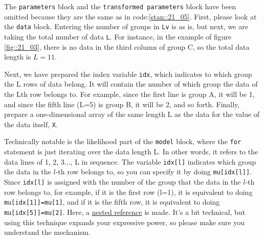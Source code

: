\documentclass{ltjsbook}
\begin{document}
The \verb|parameters| block and the \verb|transformed parameters| block have been omitted because they are the same as in code:\ref{stan::21_05}.
First, please look at the \verb|data| block. Entering the number of groups in \verb|Lv| is as is, but next, we are taking the total number of data \verb|L|. For instance, in the example of figure \ref{fig::21_03}, there is no data in the third column of group C, so the total data length is $L=11$.

Next, we have prepared the index variable \verb|idx|, which indicates to which group the L rows of data belong. It will contain the number of which group the data of the Lth row belongs to. For example, since the first line is group A, it will be 1, and since the fifth line (L=5) is group B, it will be 2, and so forth.
Finally, prepare a one-dimensional array of the same length L as the data for the value of the data itself, \verb|X|.

Technically notable is the likelihood part of the \verb|model| block, where the \verb|for| statement is just iterating over the data length L. In other words, it refers to the data lines of 1, 2, 3..., L in sequence.
The variable \verb|idx[l]| indicates which group the data in the $l$-th row belongs to, so you can specify it by doing \verb|mu[idx[l]]|. Since \verb|idx[l]| is assigned with the number of the group that the data in the $l$-th row belongs to, for example, if it is the first row (l=1), it is equivalent to doing \verb|mu[idx[1]]=mu[1]|, and if it is the fifth row, it is equivalent to doing \verb|mu[idx[5]]=mu[2]|. Here, a \underline {nested reference} is made. It's a bit technical, but using this technique expands your expressive power, so please make sure you understand the mechanism.
\end{document}
